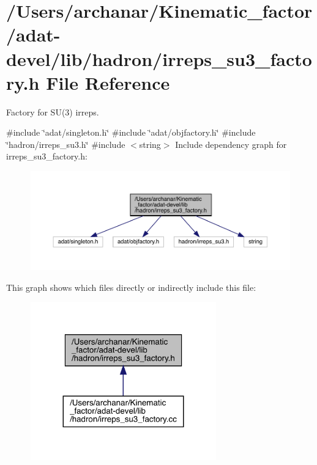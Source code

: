 \hypertarget{adat-devel_2lib_2hadron_2irreps__su3__factory_8h}{}\section{/\+Users/archanar/\+Kinematic\+\_\+factor/adat-\/devel/lib/hadron/irreps\+\_\+su3\+\_\+factory.h File Reference}
\label{adat-devel_2lib_2hadron_2irreps__su3__factory_8h}


Factory for S\+U(3) irreps.  


{\ttfamily \#include \char`\"{}adat/singleton.\+h\char`\"{}}\newline
{\ttfamily \#include \char`\"{}adat/objfactory.\+h\char`\"{}}\newline
{\ttfamily \#include \char`\"{}hadron/irreps\+\_\+su3.\+h\char`\"{}}\newline
{\ttfamily \#include $<$string$>$}\newline
Include dependency graph for irreps\+\_\+su3\+\_\+factory.\+h\+:
\nopagebreak
\begin{figure}[H]
\begin{center}
\leavevmode
\includegraphics[width=350pt]{dd/d67/adat-devel_2lib_2hadron_2irreps__su3__factory_8h__incl}
\end{center}
\end{figure}
This graph shows which files directly or indirectly include this file\+:
\nopagebreak
\begin{figure}[H]
\begin{center}
\leavevmode
\includegraphics[width=227pt]{dc/dd1/adat-devel_2lib_2hadron_2irreps__su3__factory_8h__dep__incl}
\end{center}
\end{figure}
